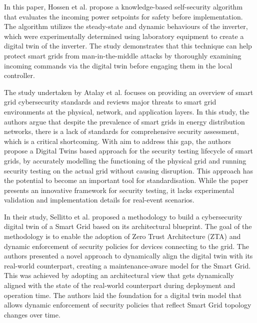 In\cite{hossenDigitalTwinSelfSecurity2021} this paper, Hossen et al. propose a knowledge-based self-security algorithm that evaluates the incoming power setpoints for safety before implementation. The algorithm utilizes the steady-state and dynamic behaviours of the inverter, which were experimentally determined using laboratory equipment to create a digital twin of the inverter. The study demonstrates that this technique can help protect smart grids from man-in-the-middle attacks by thoroughly examining incoming commands via the digital twin before engaging them in the local controller.

The study undertaken by Atalay et al.\cite{atalayDigitalTwinsApproach2020} focuses on providing an overview of smart grid cybersecurity standards and reviews major threats to smart grid environments at the physical, network, and application layers. In this study, the authors argue that despite the prevalence of smart grids in energy distribution networks, there is a lack of standards for comprehensive security assessment, which is a critical shortcoming. With aim to address this gap, the authors propose a Digital Twins based approach for the security testing lifecycle of smart grids, by accurately modelling the functioning of the physical grid and running security testing on the actual grid without causing disruption. This approach has the potential to become an important tool for standardisation. While the paper presents an innovative framework for security testing, it lacks experimental validation and implementation details for real-event scenarios.


In their study, Sellitto et al.\cite{giovannipaolosellittoEnablingZeroTrust2021} proposed a methodology to build a cybersecurity digital twin of a Smart Grid based on its architectural blueprint. The goal of the methodology is to enable the adoption of Zero Trust Architecture (ZTA) and dynamic enforcement of security policies for devices connecting to the grid. The authors presented a novel approach to dynamically align the digital twin with its real-world counterpart, creating a maintenance-aware model for the Smart Grid. This was achieved by adopting an architectural view that gets dynamically aligned with the state of the real-world counterpart during deployment and operation time. The authors laid the foundation for a digital twin model that allows dynamic enforcement of security policies that reflect Smart Grid topology changes over time. 



